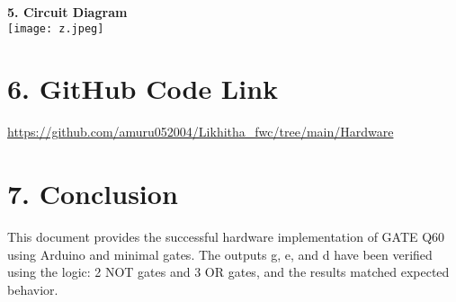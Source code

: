 \documentclass[12pt]{article}
\begin{document}
\begin{multicols}{2}
\vspace{1em}
\noindent\textbf{5. Circuit Diagram} \\
\texttt{[image: z.jpeg]} %

\end{multicols}

\newpage


\vspace{1em}
\section*{6. GitHub Code Link}
\url{https://github.com/amuru052004/Likhitha_fwc/tree/main/Hardware}

\vspace{1em}
\section*{7. Conclusion}
This document provides the successful hardware implementation of GATE Q60 using Arduino and minimal gates. The outputs g, e, and d have been verified using the logic: 2 NOT gates and 3 OR gates, and the results matched expected behavior.
\end{document}
